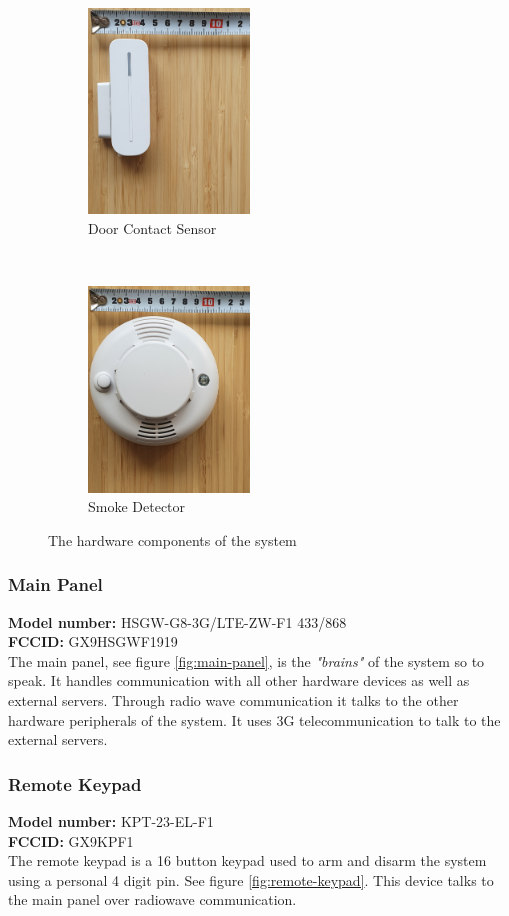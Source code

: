 \begin{figure}[!ht]
    \begin{subfigure}[t]{0.33\textwidth}
        \centering
        \includegraphics[height=2.15in]{images/door-contact.png}
        \caption{Door Contact Sensor}
        \label{fig:door-contact}
    \end{subfigure}%
    ~
    \begin{subfigure}[t]{0.33\textwidth}
        \centering
        \includegraphics[height=2.15in]{images/smoke-detector.png}
        \caption{Smoke Detector}
        \label{fig:smoke-detector}
    \end{subfigure}
    \caption{The hardware components of the system}
    \label{fig:hardware-components}
\end{figure}
\subsubsection{Main Panel}
\textbf{Model number:} HSGW-G8-3G/LTE-ZW-F1 433/868 \\
\textbf{FCCID:} GX9HSGWF1919 \\
The main panel, see figure \ref{fig:main-panel}, is the \textit{"brains"} of the system so to speak. It handles communication with all other hardware devices as well as external servers. Through radio wave communication it talks to the other hardware peripherals of the system. It uses 3G telecommunication to talk to the external servers.

\subsubsection{Remote Keypad}
\textbf{Model number:} KPT-23-EL-F1 \\ %
\textbf{FCCID:} GX9KPF1 \\ %
The remote keypad is a 16 button keypad used to arm and disarm the system using a personal 4 digit pin. See figure \ref{fig:remote-keypad}. This device talks to the main panel over radiowave communication.

